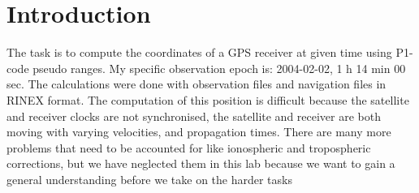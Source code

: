 
\section{Introduction} 

\label{sec:introduction}  The task is to compute the coordinates of a GPS receiver at given time using P1-code pseudo ranges. My specific observation epoch is: 2004-02-02, 1 h 14 min 00 sec. The calculations were done with observation files and navigation files in RINEX format. The computation of this position is difficult because the satellite and receiver clocks are not synchronised, the satellite and receiver are both moving with varying velocities, and propagation times. There are many more problems that need to be accounted for like ionospheric and tropospheric corrections, but we have neglected them in this lab because we want to gain a general understanding before we take on the harder tasks

